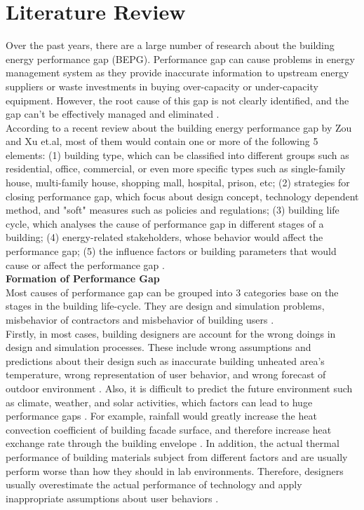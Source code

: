 \chapter{Literature Review}

	Over the past years, there are a large number of research about the building energy performance gap (BEPG). Performance gap can cause problems in energy management system as they provide inaccurate information to upstream energy suppliers or waste investments in buying over-capacity or under-capacity equipment. However, the root cause of this gap is not clearly identified, and the gap can't be effectively managed and eliminated \cite{FREI2017421}.\\
	
	According to a recent review about the building energy performance gap by Zou and Xu et.al, most of them would contain one or more of the following 5 elements: (1) building type, which can be classified into different groups such as residential, office, commercial, or even more specific types such as single-family house, multi-family house, shopping mall, hospital, prison, etc; (2) strategies for closing performance gap, which focus about design concept, technology dependent method, and "soft" measures such as policies and regulations; (3) building life cycle, which analyses the cause of performance gap in different stages of a building; (4) energy-related stakeholders, whose behavior would affect the performance gap; (5) the influence factors or building parameters that would cause or affect the performance gap \cite{FREI2017421,ZOU2018165}.\\
	
	\textbf{Formation of Performance Gap}\\
		Most causes of performance gap can be grouped into 3 categories base on the stages in the building life-cycle. They are design and simulation problems, misbehavior of contractors and misbehavior of building users \cite{userevaluations,NIU2016275}.\\
		
		Firstly, in most cases, building designers are account for the wrong doings in design and simulation processes. These include wrong assumptions and predictions about their design such as inaccurate building unheated area's temperature, wrong representation of user behavior, and wrong forecast of outdoor environment \cite{HOFFMANN201731,NIU2016275}. Also, it is difficult to predict the future environment such as climate, weather, and solar activities, which factors can lead to huge performance gaps \cite{DIAZ2017393,doi:10.1080/19401493.2012.718797}. For example, rainfall would greatly increase the heat convection coefficient of building facade surface, and therefore increase heat exchange rate through the building envelope \cite{DIAZ2017393}. In addition, the actual thermal performance of building materials subject from different factors and are usually perform worse than how they should in lab environments. Therefore, designers usually overestimate the actual performance of technology and apply inappropriate assumptions about user behaviors \cite{DEWILDE201440}. \\

